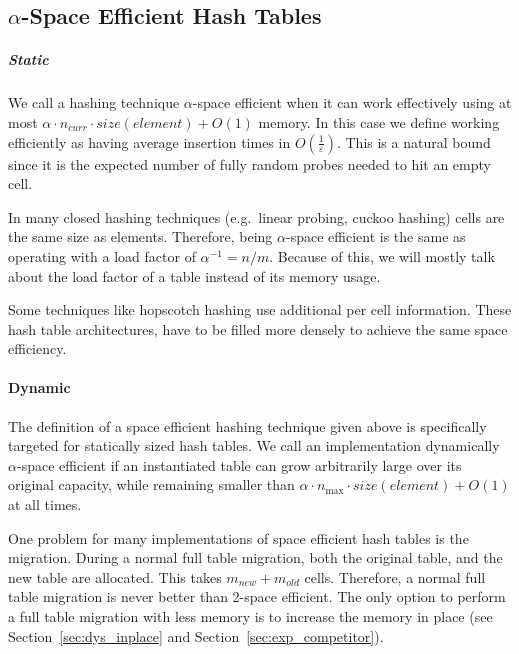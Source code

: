 \documentclass[a4paper,UKenglish]{lipics-v2016}
\begin{document}
\subsection{$\alpha$-Space Efficient Hash Tables}
\subparagraph*{Static}
\label{sec:pre_staticspace}
We call a hashing technique $\alpha$-space efficient when it can work
effectively using at most $\alpha \cdot n_{\textit{curr}} \cdot \textit{size}(\textit{element}) + O(1)$ memory. In
this case we define working efficiently as having average insertion
times in $O(\frac{1}{\varepsilon})$. This is a natural bound
since it is the expected number of fully random probes needed to hit
an empty cell.


In many closed hashing techniques (e.g.~linear probing, cuckoo
hashing) cells are the same size as elements. Therefore, being
$\alpha$-space efficient is the same as operating with a load factor
of $\alpha^{-1} = n/m$.
Because of this, we will mostly talk about the load factor of a table
instead of its memory usage.

Some techniques like hopscotch hashing use additional per cell
information.  These hash table architectures, have to be filled more
densely to achieve the same space efficiency.

\paragraph*{Dynamic}
The definition of a space efficient hashing technique given above is
specifically targeted for statically sized hash tables.  We call an
implementation dynamically $\alpha$-space efficient if an instantiated
table can grow arbitrarily large over its original capacity, while
remaining smaller than $\alpha\cdot n_{\max}\cdot
\textit{size}(\textit{element}) + O(1)$ at all times.

One problem for many implementations of space efficient hash tables is
the migration.  During a normal full table migration, both the
original table, and the new table are allocated.  This takes
$\textit{m}_{\textit{new}} + \textit{m}_{\textit{old}}$
cells. Therefore, a normal full table migration is never better than 2-space
efficient.  The only option to perform a full table migration with
less memory is to increase the memory in place (see
Section~\ref{sec:dys_inplace} and Section~\ref{sec:exp_competitor}).
\end{document}
